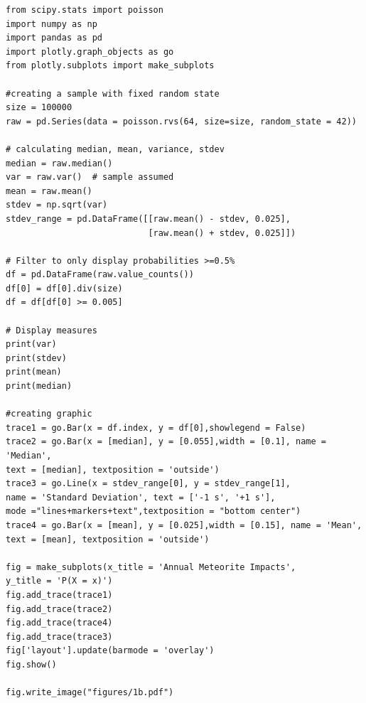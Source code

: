 \begin{verbatim}
from scipy.stats import poisson
import numpy as np
import pandas as pd
import plotly.graph_objects as go
from plotly.subplots import make_subplots

#creating a sample with fixed random state
size = 100000
raw = pd.Series(data = poisson.rvs(64, size=size, random_state = 42))

# calculating median, mean, variance, stdev
median = raw.median()
var = raw.var()  # sample assumed
mean = raw.mean()
stdev = np.sqrt(var)
stdev_range = pd.DataFrame([[raw.mean() - stdev, 0.025],
                            [raw.mean() + stdev, 0.025]])

# Filter to only display probabilities >=0.5%
df = pd.DataFrame(raw.value_counts())
df[0] = df[0].div(size)
df = df[df[0] >= 0.005]

# Display measures
print(var)
print(stdev)
print(mean)
print(median)

#creating graphic
trace1 = go.Bar(x = df.index, y = df[0],showlegend = False)
trace2 = go.Bar(x = [median], y = [0.055],width = [0.1], name = 'Median', 
text = [median], textposition = 'outside')
trace3 = go.Line(x = stdev_range[0], y = stdev_range[1], 
name = 'Standard Deviation', text = ['-1 s', '+1 s'],
mode ="lines+markers+text",textposition = "bottom center")
trace4 = go.Bar(x = [mean], y = [0.025],width = [0.15], name = 'Mean', 
text = [mean], textposition = 'outside')

fig = make_subplots(x_title = 'Annual Meteorite Impacts',
y_title = 'P(X = x)')
fig.add_trace(trace1)
fig.add_trace(trace2)
fig.add_trace(trace4)
fig.add_trace(trace3)
fig['layout'].update(barmode = 'overlay')
fig.show()

fig.write_image("figures/1b.pdf")
\end{verbatim}

